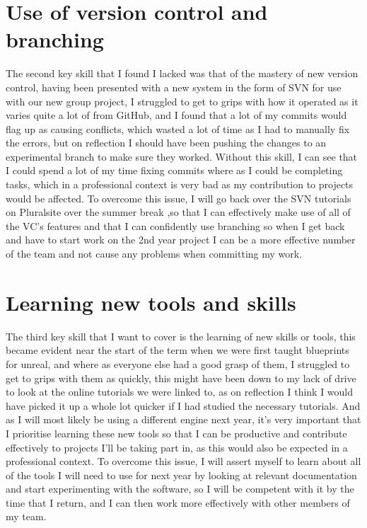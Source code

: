 \documentclass{scrartcl}
\begin{document}
\section{Use of version control and branching}
The second key skill that I found I lacked was that of the mastery of new version control, having been presented with a new system in the form of SVN for use with our new group project, I struggled to get to grips with how it operated as it varies quite a lot of from GitHub, and I found that a lot of my commits would flag up as causing conflicts, which wasted a lot of time as I had to manually fix the errors, but on reflection I should have been pushing the changes to an experimental branch to make sure they worked. Without this skill, I can see that I could spend a lot of my time fixing commits where as I could be completing tasks, which in a professional context is very bad as my contribution to projects would be affected. To overcome this issue, I will go back over the SVN tutorials on Pluralsite over the summer break ,so that I can effectively make use of all of the VC's features and that I can confidently use branching so when I get back and have to start work on the 2nd year project I can be a more effective number of the team and not cause any problems when committing my work. 

\section{Learning new tools and skills}
The third key skill that I want to cover is the learning of new skills or tools, this became evident near the start of the term when we were first taught blueprints for unreal, and where as everyone else had a good grasp of them, I struggled to get to grips with them as quickly, this might have been down to my lack of drive to look at the online tutorials we were linked to, as on reflection I think I would have picked it up a whole lot quicker if I had studied the necessary tutorials. And as I will most likely be using a different engine next year, it's very important that I prioritise learning these new tools so that I can be productive and contribute effectively to projects I'll be taking part in, as this would also be expected in a professional context. To overcome this issue, I will assert myself to learn about all of the tools I will need to use for next year by looking at relevant documentation and start experimenting with the software, so I will be competent with it by the time that I return, and I can then work more effectively with other members of my team. 
\end{document}
